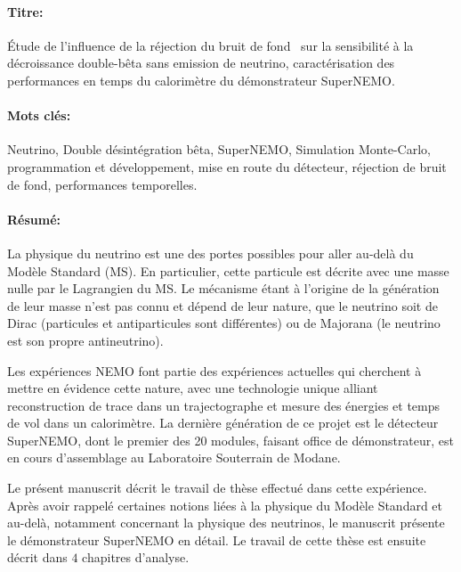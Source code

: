\begin{mdframed}[linecolor=Prune,linewidth=1]
\vspace{-.25cm}
\paragraph*{Titre:} Étude de l'influence de la réjection du bruit de fond \Tl\ sur la sensibilité à la décroissance double-bêta sans emission de neutrino, caractérisation des performances en temps du calorimètre du démonstrateur SuperNEMO.

\begin{footnotesize}
\vspace{-.25cm}
\paragraph*{Mots clés:} Neutrino, Double désintégration bêta, SuperNEMO, Simulation Monte-Carlo, programmation et développement, mise en route du détecteur, réjection de bruit de fond, performances temporelles.

\vspace{-.5cm}
\begin{multicols}{2}
\paragraph*{Résumé:} La physique du neutrino est une des portes possibles pour aller au-delà du Modèle Standard (MS).
En particulier, cette particule est décrite avec une masse nulle par le Lagrangien du MS.
Le mécanisme étant à l'origine de la génération de leur masse n'est pas connu et dépend de leur nature, que le neutrino soit de Dirac (particules et antiparticules sont différentes) ou de Majorana (le neutrino est son propre antineutrino).

Les expériences NEMO font partie des expériences actuelles qui cherchent à mettre en évidence cette nature, avec une technologie unique alliant reconstruction de trace dans un trajectographe et mesure des énergies et temps de vol dans un calorimètre.
La dernière génération de ce projet est le détecteur SuperNEMO, dont le premier des 20 modules, faisant office de démonstrateur, est en cours d'assemblage au Laboratoire Souterrain de Modane.

Le présent manuscrit décrit le travail de thèse effectué dans cette expérience.
Après avoir rappelé certaines notions liées à la physique du Modèle Standard et au-delà, notamment concernant la physique des neutrinos, le manuscrit présente le démonstrateur SuperNEMO en détail.
Le travail de cette thèse est ensuite décrit dans $4$ chapitres d'analyse.


\end{multicols}
\end{footnotesize}
\end{mdframed}
